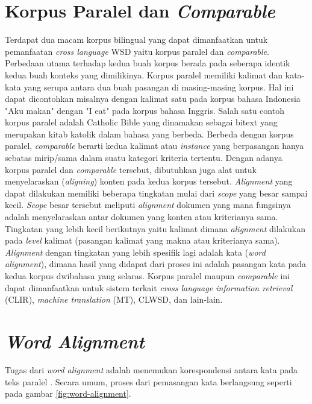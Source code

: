 \section{Korpus Paralel dan \textit{Comparable}}
Terdapat dua macam korpus bilingual yang dapat dimanfaatkan untuk pemanfaatan \textit{cross language } WSD yaitu korpus paralel dan \textit{comparable}. Perbedaan utama terhadap kedua buah korpus berada pada seberapa identik kedua buah konteks yang dimilikinya. Korpus paralel memiliki kalimat dan kata-kata yang serupa antara dua buah pasangan di masing-masing korpus. Hal ini dapat dicontohkan misalnya dengan kalimat satu pada korpus bahasa Indonesia "Aku makan" dengan "I eat" pada korpus bahasa Inggris. Salah satu contoh korpus paralel adalah Catholic Bible yang dinamakan sebagai bitext \citep{rudnick2011towards} yang merupakan kitab katolik dalam bahasa yang berbeda. Berbeda dengan korpus paralel, \textit{comparable} berarti kedua kalimat atau \textit{instance} yang berpasangan hanya sebatas mirip/sama dalam suatu kategori kriteria tertentu. Dengan adanya korpus paralel dan \textit{comparable} tersebut, dibutuhkan juga alat untuk menyelaraskan (\textit{aligning}) konten pada kedua korpus tersebut. \textit{Alignment} yang dapat dilakukan memiliki beberapa tingkatan mulai dari \textit{scope} yang besar sampai kecil. \textit{Scope} besar tersebut meliputi \textit{alignment} dokumen yang mana fungsinya adalah menyelaraskan antar dokumen yang konten atau kriterianya sama. Tingkatan yang lebih kecil berikutnya yaitu kalimat dimana \textit{alignment} dilakukan pada \textit{level} kalimat (pasangan kalimat yang makna atau kriterianya sama). \textit{Alignment} dengan tingkatan yang lebih spesifik lagi adalah kata (\textit{word alignment}), dimana hasil yang didapat dari proses ini adalah pasangan kata pada kedua korpus dwibahasa yang selaras. Korpus paralel maupun \textit{comparable} ini dapat dimanfaatkan untuk sistem terkait  \textit{cross language information retrieval} (CLIR), \textit{machine translation} (MT), CLWSD, dan lain-lain.
\section{\textit{Word Alignment}}
Tugas dari \textit{word alignment} adalah menemukan korespondensi antara kata pada teks paralel 
\citep{mihalcea2003evaluation}. Secara umum, proses dari pemasangan kata berlangsung seperti pada gambar \ref{fig:word-alignment}.


